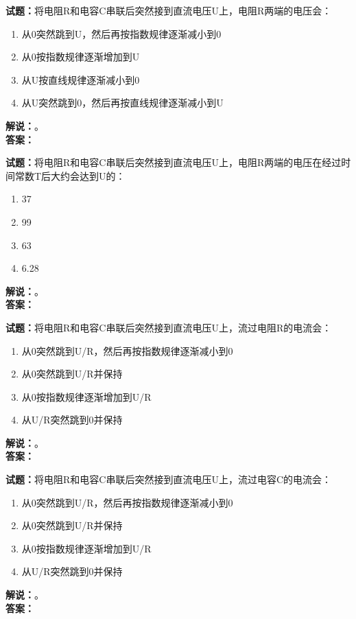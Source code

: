 \documentclass{ctexbook}
\begin{document}
\bigskip

\noindent\textbf{试题：}将电阻R和电容C串联后突然接到直流电压U上，电阻R两端的电压会：
\begin{enumerate}[leftmargin=3em]
  \item 从0突然跳到U，然后再按指数规律逐渐减小到0
  \item 从0按指数规律逐渐增加到U
  \item 从U按直线规律逐渐减小到0
  \item 从U突然跳到0，然后再按直线规律逐渐减小到U
\end{enumerate}
\noindent\textbf{解说：}\textbf{}。\\\noindent\textbf{答案：}

\bigskip

\noindent\textbf{试题：}将电阻R和电容C串联后突然接到直流电压U上，电阻R两端的电压在经过时间常数T后大约会达到U的：
\begin{enumerate}[leftmargin=3em]
  \item 37%
  \item 99%
  \item 63%
  \item 6.28%
\end{enumerate}
\noindent\textbf{解说：}\textbf{}。\\\noindent\textbf{答案：}

\bigskip

\noindent\textbf{试题：}将电阻R和电容C串联后突然接到直流电压U上，流过电阻R的电流会：
\begin{enumerate}[leftmargin=3em]
  \item 从0突然跳到U/R，然后再按指数规律逐渐减小到0
  \item 从0突然跳到U/R并保持
  \item 从0按指数规律逐渐增加到U/R
  \item 从U/R突然跳到0并保持
\end{enumerate}
\noindent\textbf{解说：}\textbf{}。\\\noindent\textbf{答案：}

\bigskip

\noindent\textbf{试题：}将电阻R和电容C串联后突然接到直流电压U上，流过电容C的电流会：
\begin{enumerate}[leftmargin=3em]
  \item 从0突然跳到U/R，然后再按指数规律逐渐减小到0
  \item 从0突然跳到U/R并保持
  \item 从0按指数规律逐渐增加到U/R
  \item 从U/R突然跳到0并保持
\end{enumerate}
\noindent\textbf{解说：}\textbf{}。\\\noindent\textbf{答案：}
\end{document}
